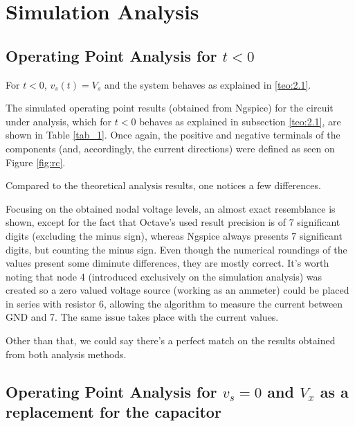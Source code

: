 \newpage

\section{Simulation Analysis}
\label{sec:simulation}
\captionsetup[table]{skip=10pt}

\subsection{Operating Point Analysis for $t<0$}

\vspace{5mm}
\par For $t<0$, $v_s(t)=V_s$ and the system behaves as explained in \ref{teo:2.1}. 

\vspace{3mm}
\par The simulated operating point results (obtained from Ngspice) for the circuit under analysis, which for $t<0$ behaves as explained in subsection \ref{teo:2.1}, are shown in Table \ref{tab_1}. Once again, the positive and negative terminals of the components (and, accordingly, the current directions) were defined as seen on Figure \ref{fig:rc}.

\vspace{3mm}
\par Compared to the theoretical analysis results, one notices a few differences.
\vspace{3mm}
\par Focusing on the obtained nodal voltage levels, an almost exact resemblance is shown, except for the fact that Octave's used result precision is of 7 significant digits (excluding the minus sign), whereas Ngspice always presents 7 significant digits, but counting the minus sign. Even though the numerical roundings of the values present some diminute differences, they are mostly correct. It's worth noting that node 4 (introduced exclusively on the simulation analysis) was created so a zero valued voltage source (working as an ammeter) could be placed in series with resistor 6, allowing the algorithm to measure the current between GND and 7. The same issue takes place with the current values.

\vspace{3mm}
\par Other than that, we could say there's a perfect match on the results obtained from both analysis methods.
\vspace{5mm}

\subsection{Operating Point Analysis for $v_s=0$ and $V_x$ as a replacement for the capacitor}
\label{op_2}


